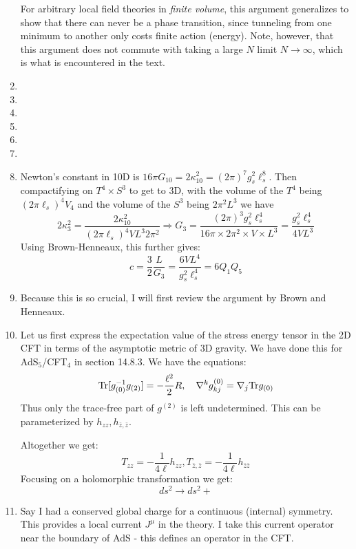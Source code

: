 \documentclass[11pt, class=article, crop=false]{standalone}
\begin{document}
\begin{enumerate}
	For arbitrary local field theories in \emph{finite volume}, this argument generalizes to show that there can never be a phase transition, since tunneling from one minimum to another only costs finite action (energy). Note, however, that this argument does not commute with taking a large $N$ limit $N \to \infty$, which is what is encountered in the text. 
	
	\item 
	
	\item 
	
	\item 
	
	\item 
	
	\item 
	
	\item 
	
	\item Newton's constant in 10D is $16\pi G_{10} = 2 \kappa_{10}^2 = (2\pi)^7 g_s^2 \ell_s^8$. Then compactifying on $T^4 \times S^3$ to get to 3D, with the volume of the $T^4$ being $(2\pi \ell_s)^4 V_4$ and the volume of the $S^3$ being $2 \pi^2 L^3$ we have
	\[
		2 \kappa_{3}^2 = \frac{2 \kappa_{10}^2}{(2 \pi \ell_s)^4 V L^3 2 \pi^2} \Rightarrow G_3 = \frac{(2\pi)^3 g_s^2 \ell_s^4}{16 \pi \times 2 \pi^2 \times V \times L^3} = \frac{g_s^2 \ell_s^4}{4 V L^3}
	\]
	Using Brown-Henneaux, this further gives:
	\[
		c = \frac32 \frac{L}{G_3} = \frac{6 V L^4}{g_s^2 \ell_s^4} = 6 Q_1 Q_5
	\]
	\item Because this is so crucial, I will first review the argument by Brown and Henneaux. 
	
	\item Let us first express the expectation value of the stress energy tensor in the 2D CFT in terms of the asymptotic metric of 3D gravity. We have done this for AdS$_5$/CFT$_4$ in section 14.8.3. We have the equations:
	\[
		\mathrm{Tr} [g_{(0)}^{-1} g_{(2)}] = - \frac{\ell^2}{2} R, \quad \nabla^k g_{kj}^{(0)} = \nabla_j \mathrm{Tr} g_{(0)}
	\]
	Thus only the trace-free part of $g^{(2)}$ is left undetermined. This can be parameterized by $h_{zz}, h_{\bar z, \bar z}$.
	
	
	Altogether we get:
	\[
		T_{zz} = - \frac{1}{4 \ell} h_{zz}, T_{\bar z, \bar z} = - \frac{1}{4 \ell} h_{\bar z \bar z}
	\]
	Focusing on a holomorphic transformation we get:
	\[
		ds^2 \to ds^2 + 
	\]
	
	
	\item 
	Say I had a conserved global charge for a continuous (internal) symmetry. This provides a local current $J^\mu$ in the theory. I take this current operator near the boundary of AdS - this defines an operator in the CFT. 
	

\end{enumerate}
\end{document}
